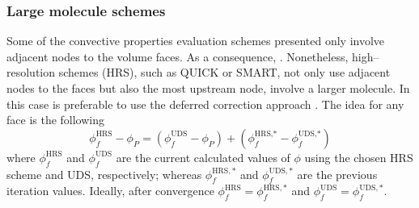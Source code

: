 \subsubsection{Large molecule schemes}

Some of the convective properties evaluation schemes presented only involve adjacent nodes to the volume faces. As a consequence, . Nonetheless, high--resolution schemes (HRS), such as QUICK or SMART, not only use adjacent nodes to the faces but also the most upstream node, \ie involve a larger molecule. In this case is preferable to use the deferred correction approach \cite{cttc_cde_2021}. The idea for any face is the following
\begin{equation}
	\phi_f^\text{HRS} - \phi_P = 
	\left( \phi_f^\text{UDS} - \phi_P \right) + 
	\left( \phi_f^{\text{HRS,}\ast} - \phi_f^{\text{UDS,}\ast} \right)
\end{equation}
where $\phi_f^\text{HRS}$ and $\phi_f^\text{UDS}$ are the current calculated values of $\phi$ using the chosen HRS scheme and UDS, respectively; whereas $\phi_f^{\text{HRS},\ast}$ and $\phi_f^{\text{UDS},\ast}$ are the previous iteration values. Ideally, after convergence $\phi_f^\text{HRS} = \phi_f^{\text{HRS},\ast}$ and $\phi_f^\text{UDS} = \phi_f^{\text{UDS},\ast}$.


\cite{cfd_online_schemes}

